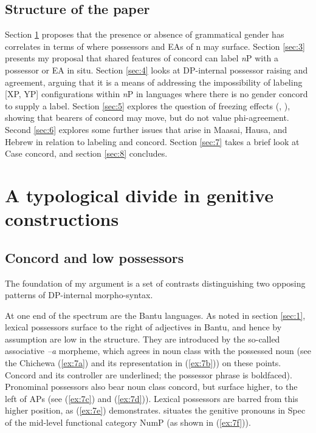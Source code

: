 \documentclass[output=paper
,modfonts
,nonflat]{langsci/langscibook}
\begin{document}
\subsection{Structure of the paper} \label{sec:1.5}
Section \ref{sec:2} proposes that the presence or absence of grammatical gender has correlates in terms of where possessors and EAs of n may surface. Section \ref{sec:3} presents my proposal that shared features of concord can label \textit{n}P with a possessor or EA in situ. Section \ref{sec:4} looks at DP-internal possessor raising and agreement, arguing that it is a means of addressing the impossibility of labeling [XP, YP] configurations within \textit{n}P in languages where there is no gender concord to supply a label. Section \ref{sec:5} explores the question of {\textquotedbl}freezing{\textquotedbl} effects (\citealt{Rizzi2006}, \citealt{Rizzi_Shlonsky2007}), showing that bearers of concord may move, but do not value phi-agreement. Second \ref{sec:6} explores some further issues that arise in Maasai, Hausa, and Hebrew in relation to labeling and concord. Section \ref{sec:7} takes a brief look at Case concord, and section \ref{sec:8} concludes.

\section{A typological divide in genitive constructions} \label{sec:2}
\subsection{Concord and low possessors} \label{sec:2.1}
The foundation of my argument is a set of contrasts distinguishing two opposing patterns of DP-internal morpho-syntax. 

At one end of the spectrum are the Bantu languages. As noted in section \ref{sec:1}, lexical possessors surface to the right of adjectives in Bantu, and hence by assumption are low in the structure. They are introduced by the so-called associative \textit{–a} morpheme, which agrees in noun class with the possessed noun (see the Chichewa (\ref{ex:7a}) and its representation in (\ref{ex:7b})) on these points. Concord and its controller are underlined; the possessor phrase is boldfaced). Pronominal possessors also bear noun class concord, but surface higher, to the left of APs (see (\ref{ex:7c}) and (\ref{ex:7d})). Lexical possessors are barred from this higher position, as (\ref{ex:7e}) demonstrates. \citet{Carstens1991, Carstens1997} situates the genitive pronouns in Spec of the mid-level functional category NumP (as shown in (\ref{ex:7f})).
\end{document}
